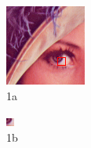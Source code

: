 \documentclass[pdftex,12pt,a4paper]{report}
\begin{document}
\begin{figure}[h]
\begin{subfigure}{.5\textwidth}
  \centering
  \includegraphics[width=.8\linewidth]{lenna_marked_small}
  \caption{1a}
  \label{fig:lenas1}
\end{subfigure}%
\begin{subfigure}{.5\textwidth}
  \centering
  \includegraphics[width=.8\linewidth]{lenna_small}
  \caption{1b}
  \label{fig:lenas2}
\end{subfigure}
\centering
\begin{subfigure}{.5\textwidth}

\end{subfigure}
\end{figure}
\end{document}
